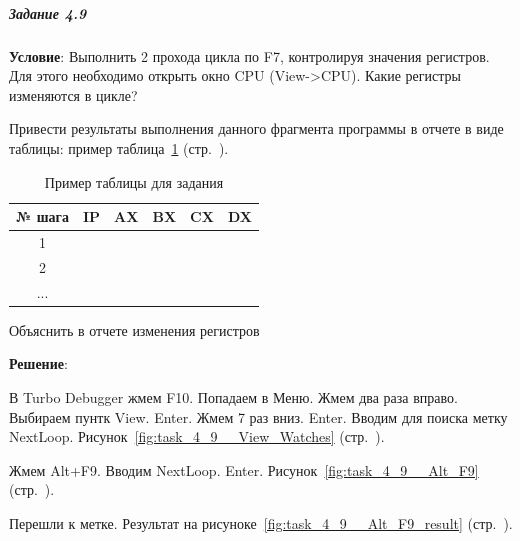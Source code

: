 \subparagraph{Задание 4.9}

\textbf{Условие}:
Выполнить 2 прохода цикла по F7, контролируя значения регистров. Для этого необходимо открыть окно CPU (View->CPU). Какие регистры изменяются в цикле?

Привести результаты выполнения данного фрагмента программы в отчете в виде таблицы: пример таблица~\ref{tab:task_4_9} (стр.~\pageref{tab:task_4_9}).

\begin{table}[!ht]
    \centering
    \caption{Пример таблицы для задания}
    \label{tab:task_4_9}
    \begin{tabular}{|c|c|c|c|c|c|} 
        \hline
        № шага  & IP  & AX  & BX  & CX  & DX  \\ \hline
        \hline
        1       &     &     &     &     &     \\ \hline
        2       &     &     &     &     &     \\ \hline
        ...     &     &     &     &     &     \\ \hline
    \end{tabular}
\end{table}

Объяснить в отчете изменения регистров

\textbf{Решение}:

В Turbo Debugger жмем F10. Попадаем в Меню. Жмем два раза вправо. Выбираем пунтк View. Enter. Жмем 7 раз вниз. Enter. Вводим для поиска метку NextLoop. Рисунок~\ref{fig:task_4_9__View_Watches} (стр.~\pageref{fig:task_4_9__View_Watches}).

Жмем Alt+F9. Вводим NextLoop. Enter. Рисунок~\ref{fig:task_4_9__Alt_F9} (стр.~\pageref{fig:task_4_9__Alt_F9}).

Перешли к метке. Результат на рисуноке~\ref{fig:task_4_9__Alt_F9_result} (стр.~\pageref{fig:task_4_9__Alt_F9_result}).

